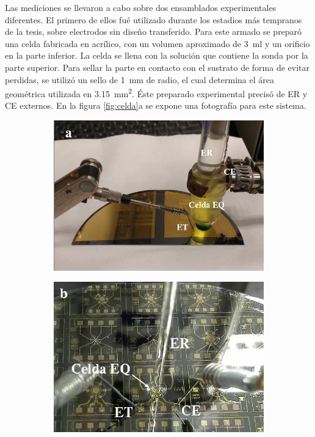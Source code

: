 			Las mediciones se llevaron a cabo sobre dos ensamblados experimentales diferentes. El primero de ellos fué utilizado durante los estadios más tempranos de la tesis, sobre electrodos sin diseño transferido. Para este armado se preparó una celda fabricada en acrílico, con un volumen aproximado de \SI{3}{\ml} y un orificio en la parte inferior. La celda se llena con la solución que contiene la sonda por la parte superior. Para sellar la parte en contacto con el sustrato de forma de evitar perdidas, se utilizó un sello de \SI{1}{\mm} de radio, el cual determina el área geométrica utilizada en \SI{3.15}{\mm^{2}}. Éste preparado experimental precisó de ER y CE externos. En la figura \ref{fig:celda}a se expone una fotografía para este sistema. 

					 \begin{figure}[t!]
			  		 \begin{subfigure}[t]{0.495\textwidth}
			  		  \includegraphics[width=\textwidth]{Imagenes/EQ1.jpg}
			  		  \end{subfigure}
			  		  \begin{subfigure}[t]{0.495\textwidth}
			  		  \includegraphics[width=\textwidth]{Imagenes/EQ2.jpg}

\end{subfigure}
\end{figure}
